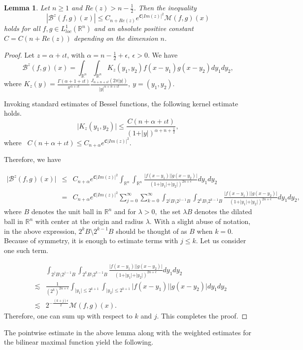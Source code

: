 \documentclass[a4paper,12pt]{amsart}
\newtheorem{lemma}[theorem]{Lemma}
\newcommand{\R}{{\mathbb {R}}}
\begin{document}
\begin{lemma}
Let $n\geq 1$ and  $Re(z)>n-\frac{1}{2}$. Then the inequality 
$$|\mathcal {B}^{z}(f,g)(x)|\leq C_{n+Re(z)} e^{\mathfrak{C}\vert Im(z)\vert^{2}}\mathcal{M}(f,g)(x)$$ holds for all $f,g\in L^{1}_{loc}(\mathbb{R}^{n})$ and an absolute positive constant $C=C(n+Re(z))$ depending on the dimension $n$.

\end{lemma}
\begin{proof}
Let $z=\alpha+\iota t$, with $\alpha=n-\frac{1}{2}+\epsilon,~\epsilon>0$. We have 
$$\mathcal {B}^{z}(f,g)(x)=\int_{\R^n}\int_{\R^n} K_{z}(y_{1},y_{2})f(x-y_{1})g(x-y_{2})dy_{1}dy_{2},$$
where  $K_{z}(y) = \frac{\Gamma(\alpha+1+\iota t)}{\pi^{\alpha+\iota t}}\frac{J_{\alpha+n+\iota t}(2\pi \vert y\vert)}{\vert y\vert^{\alpha+n+\iota t}},~y=(y_{1},y_{2})$.

Invoking standard estimates of Bessel functions, the following kernel estimate holds.
$$\vert K_{z}(y_{1},y_{2})\vert\leq \frac{C(n+\alpha+\iota t)}{(1+ \vert y\vert)^{\alpha+n+\frac{1}{2}}},$$
where~ $C(n+\alpha+\iota t)\leq C_{n+\alpha}e^{\mathfrak{C}\vert Im(z)\vert^{2}}.$

Therefore, we have

\begin{eqnarray*}
\vert \mathcal {B}^{z}(f,g)(x)\vert
&\leq & C_{n+\alpha} e^{\mathfrak{C}\vert Im(z)\vert^{2}} \int_{\mathbb{R}^{n}}\int_{\mathbb{R}^{n}}\frac{\vert f(x-y_{1})\vert \vert g(x-y_{2})\vert}{(1+\vert y_{1}\vert+\vert y_{2}\vert)^{2n+\epsilon}}dy_{1}dy_{2}\\
&=& C_{n+\alpha} e^{\mathfrak{C}\vert Im (z)\vert^{2}}
\sum_{j=0}^{\infty}\sum_{k=0}^{\infty}\int_{2^jB \setminus 2^{j-1}B} \int_{2^kB \setminus 2^{k-1}B}\frac{\vert f(x-y_{1})\vert \vert g(x-y_{2})\vert}{(1+\vert y_{1}\vert+\vert y_{2}\vert)^{2n+\epsilon}}dy_{1}dy_{2},
\end{eqnarray*}
where $B$ denotes the unit ball in $\R^n$ and for $\lambda>0,$ the set $\lambda B$ denotes the dilated ball in $\R^n$ with center at the origin and radius $\lambda.$ With a slight abuse of notation, in the above expression, $2^kB \setminus 2^{k-1}B$ should be thought of as $B$ when $k=0.$ 
Because of symmetry, it is enough to estimate terms with $j\leq k$. Let us consider one such term.  

\begin{eqnarray*}
& & \int_{2^jB \setminus 2^{j-1}B} \int_{2^kB \setminus 2^{k-1}B}\frac{\vert f(x-y_{1})\vert \vert g(x-y_{2})\vert}{(1+\vert y_{1}\vert+\vert y_{2}\vert)^{2n+\epsilon}}dy_{1}dy_{2} \\
&\lesssim & \frac{1}{(2^k)^{2n+\epsilon}}\int_{\vert y_{1}\vert\leq 2^{k+1}}\int_{\vert y_{2}\vert\leq 2^{k+1}}\vert f(x-y_{1})\vert \vert g(x-y_{2})\vert dy_{1}dy_{2}\\
&\lesssim & 2^{-\frac{(k+j)\epsilon}{2}} \mathcal M(f,g)(x). 
\end{eqnarray*}
Therefore, one can sum up with respect to $k$ and $j$. 
This completes the proof. 
\end{proof}
The pointwise estimate in the above lemma along with the weighted estimates for the bilinear maximal function yield the following. 
\end{document}
